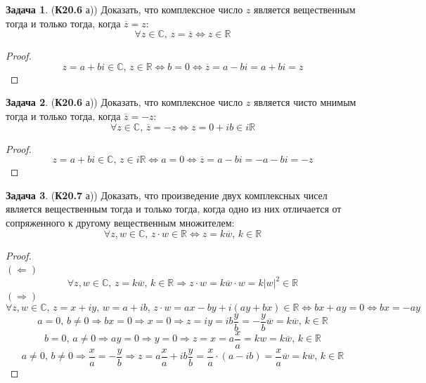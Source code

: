 \documentclass[12pt]{article}
\newcommand{\MR}{\mathbb{R}}
\newcommand{\MC}{\mathbb{C}}
\theoremstyle{definition}
\newtheorem{problem}{Задача}
\newcommand{\ovl}[1]{\overline{#1}}
\begin{document}
\begin{problem}(\textbf{К20.6} а))
	Доказать, что комплексное число $z$ является вещественным тогда и только тогда, когда $\ovl{z} = z$:
	$$
		\forall z \in \MC, \, z = \ovl{z} \Leftrightarrow z \in \MR
	$$
\end{problem}
\begin{proof}
	$$
		z = a + bi \in \MC, \, z \in \MR \Leftrightarrow  b =0 \Leftrightarrow \ovl{z} = a - bi = a + bi = z 
	$$
\end{proof}
\begin{problem}(\textbf{К20.6} а))
	Доказать, что комплексное число $z$ является чисто мнимым тогда и только тогда, когда $\ovl{z} = -z$:
	$$
		\forall z \in \MC, \, \ovl{z} = - z \Leftrightarrow z = 0 + ib \in i\MR
	$$
\end{problem}
\begin{proof}
	$$
		z = a + bi \in \MC, \, z \in i\MR \Leftrightarrow  a =0 \Leftrightarrow \ovl{z} = a - bi = -a - bi = -z 
	$$
\end{proof}
\begin{problem}(\textbf{К20.7} а))
	Доказать, что произведение двух комплексных чисел является вещественным тогда и только тогда, когда одно из них отличается от сопряженного к другому вещественным множителем:
	$$
		\forall z,w \in \MC, \, z{\cdot}w \in \MR \Leftrightarrow z = k\ovl{w}, \, k \in \MR
	$$
\end{problem}
\begin{proof}\hfill\\
	$(\Leftarrow)$
	$$
		\forall z,w \in \MC,\, z = k\ovl{w}, \, k \in \MR \Rightarrow z{\cdot}w = k\ovl{w}{\cdot}w = k|w|^2 \in \MR
	$$
	$(\Rightarrow)$
	$$
		\forall z, w\in \MC, \, z = x + iy, \, w = a + ib,\, z{\cdot}w = ax - by +i(ay + bx) \in \MR \Leftrightarrow bx +ay = 0 \Leftrightarrow bx = - ay
	$$
	$$
		a = 0, \, b  \neq 0 \Rightarrow bx = 0 \Rightarrow x = 0 \Rightarrow z = iy = ib\dfrac{y}{b}= -\dfrac{y}{b}\ovl{w} = k\ovl{w}, \, k \in \MR
	$$
	$$
		b = 0, \, a \neq 0 \Rightarrow ay = 0 \Rightarrow y = 0 \Rightarrow z = x = a\dfrac{x}{a} = kw = k\ovl{w}, \, k \in \MR
	$$
	$$
		a \neq 0, \, b \neq 0 \Rightarrow \dfrac{x}{a} = - \dfrac{y}{b} \Rightarrow z = a\dfrac{x}{a} + ib\dfrac{y}{b} = \dfrac{x}{a}{\cdot}(a - ib) = \dfrac{x}{a}\ovl{w} = k\ovl{w}, \, k \in \MR
	$$
\end{proof}
\end{document}
